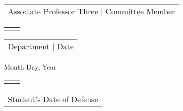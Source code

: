 \begin{center}
  \begin{tabular}{c}
    Associate Professor Three | Committee Member\\
  \end{tabular}
  \vfill  

  \begin{tabular}{@{}p{5in}p{6in}@{}}
    \hrulefill
  \end{tabular}

  \begin{tabular}{c}
    Department | Date\\
  \end{tabular}
  \vspace*{\fill}

  Month Day, Year \
  \begin{tabular}{@{}p{5in}p{6in}@{}}
    \hrulefill
  \end{tabular}

  \begin{tabular}{c}
    Student's Date of Defense\\
  \end{tabular}
  \vfill
     
\end{center}